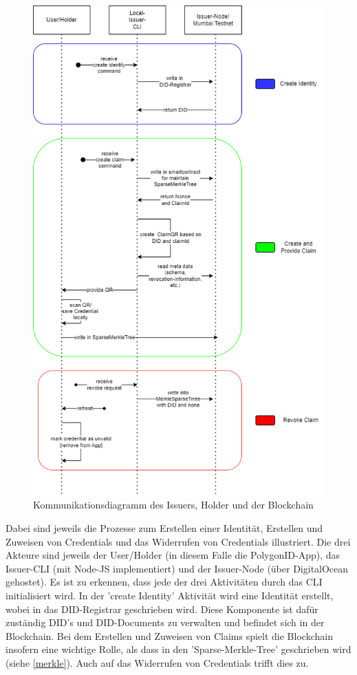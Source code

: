 \begin{figure}[H]
	\centering	
	\includegraphics[scale=0.6]{media/ablaufdiagram.drawio}
	\caption{Kommunikationsdiagramm des Issuers, Holder und der Blockchain}
	\label{fig:komm}
\end{figure}
Dabei sind jeweils die Prozesse zum Erstellen einer Identität, Erstellen und Zuweisen von Credentials und das Widerrufen von Credentials illustriert. Die drei Akteure sind jeweils der User/Holder (in diesem Falle die PolygonID-App), das Issuer-CLI (mit Node-JS implementiert) und der Issuer-Node (über DigitalOcean gehostet). Es ist zu erkennen, dass jede der drei Aktivitäten durch das CLI initialisiert wird. In der 'create Identity' Aktivität wird eine Identität erstellt, wobei in das DID-Registrar geschrieben wird. Diese Komponente ist dafür zuständig DID's und DID-Documents zu verwalten und befindet sich in der Blockchain.
Bei dem Erstellen und Zuweisen von Claims spielt die Blockchain insofern eine wichtige Rolle, als dass in den 'Sparse-Merkle-Tree' geschrieben wird (siehe \ref{merkle}). Auch auf das Widerrufen von Credentials trifft dies zu.
